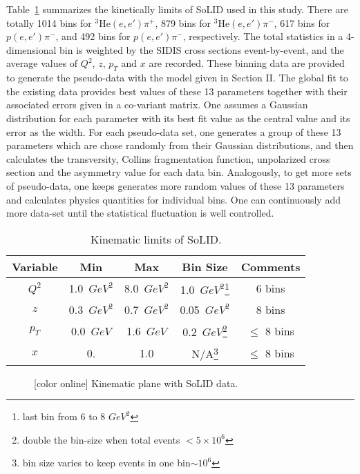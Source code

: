 \documentclass[twocolumn,showpacs,preprintnumbers,amsmath,amssymb,floatfix,prd]{revtex4}
\begin{document}
Table~\ref{tab:kinem} summarizes the kinetically limits of SoLID used in this study. There are totally 1014 bins for $\mathrm{^{3}He}(e,e')\pi^{+}$, 879 bins for $\mathrm{^{3}He}(e,e')\pi^{-}$, 617 bins for $p(e,e')\pi^{-}$, and 492 bins for $p(e,e')\pi^{-}$, respectively. The total statistics in a 4-dimensional bin is weighted by the SIDIS cross sections event-by-event, and the average values of  $Q^{2}$, $z$, $p_{T}$ and $x$ are recorded. These binning data are provided to generate the pseudo-data with the model given in Section II. The global fit to the existing data provides best values of these 13 parameters together with their associated errors given in a co-variant matrix. One assumes a Gaussian distribution for each parameter with its best fit value as the central value and its error as the width. For each pseudo-data set, one generates a group of these 13 parameters which are chose randomly from their Gaussian distributions, and then calculates the transversity, Collins fragmentation function, unpolarized cross section and the asymmetry value for each data bin. Analogously, to get more sets of pseudo-data, one keeps generates more random values of these 13 parameters and calculates physics quantities for individual bins. One can continuously add  more data-set until the statistical fluctuation is well controlled.
  
 


\begin{table}[bth!]
\begin{tabular}{|c|c|c|c|c|}
\hline
Variable      & Min  & Max & Bin Size & Comments  \\ \hline
  $Q^{2}$    & 1.0~$GeV^{2}$  & 8.0~$GeV^{2}$  & 1.0~$GeV^{2}$\footnote{last bin from 6 to 8 $GeV^{2}$}   & 6 bins\\
  $z$           &  0.3~$GeV^{2}$ & 0.7~$GeV^{2}$  & 0.05~$GeV^{2}$ & 8 bins\\
  $p_{T}$    &  0.0~$GeV$ &  1.6~$GeV$&  0.2~$GeV$\footnote{double the bin-size when total events $<5\times 10^{6}$}& $\leq$ 8 bins \\
  $x$           & 0. & 1.0 & N/A\footnote{bin size varies to keep events in one bin$\sim10^{6}$} &  $\leq$ 8 bins \\\hline
\end{tabular}
\caption{\label{tab:kinem} Kinematic limits of SoLID.}
\end{table}
%


%
\begin{figure}[thb!]
\vspace*{-0.4cm}
\begin{center}
\vspace*{-0.6cm}
 \end{center}
\vspace*{-0.7cm}
\caption{\label{fig:kimen} [color online]
Kinematic plane with SoLID data.}
\end{figure}
%
 
\end{document}
